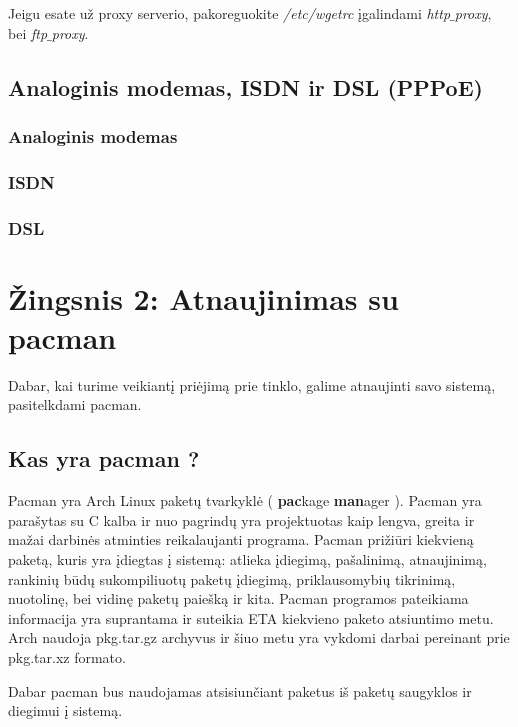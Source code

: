     Jeigu esate už proxy serverio, pakoreguokite \textsl{/etc/wgetrc}
    įgalindami \textsl{http$\_$proxy}, bei \textsl{ftp$\_$proxy}. 

    \subsection{Analoginis modemas, ISDN ir DSL (PPPoE)}

      \subsubsection{Analoginis modemas}

      \subsubsection{ISDN}

      \subsubsection{DSL}


  \section{Žingsnis 2: Atnaujinimas su pacman}

    Dabar, kai turime veikiantį priėjimą prie tinklo, galime
    atnaujinti savo sistemą, pasitelkdami pacman.

    \subsection{Kas yra pacman ?}

    Pacman yra Arch Linux paketų tvarkyklė ( \textbf{pac}kage
    \textbf{man}ager ). Pacman yra parašytas su C kalba ir nuo
    pagrindų yra projektuotas kaip lengva, greita ir mažai darbinės
    atminties reikalaujanti programa. Pacman prižiūri kiekvieną
    paketą, kuris yra įdiegtas į sistemą: atlieka įdiegimą,
    pašalinimą, atnaujinimą, rankinių būdų sukompiliuotų paketų
    įdiegimą, priklausomybių tikrinimą, nuotolinę, bei vidinę paketų
    paiešką ir kita. Pacman programos pateikiama informacija yra
    suprantama ir suteikia ETA kiekvieno paketo atsiuntimo metu. Arch
    naudoja pkg.tar.gz archyvus ir šiuo metu yra vykdomi darbai
    pereinant prie pkg.tar.xz formato.

    Dabar pacman bus naudojamas atsisiunčiant paketus iš paketų
    saugyklos ir diegimui į sistemą.

